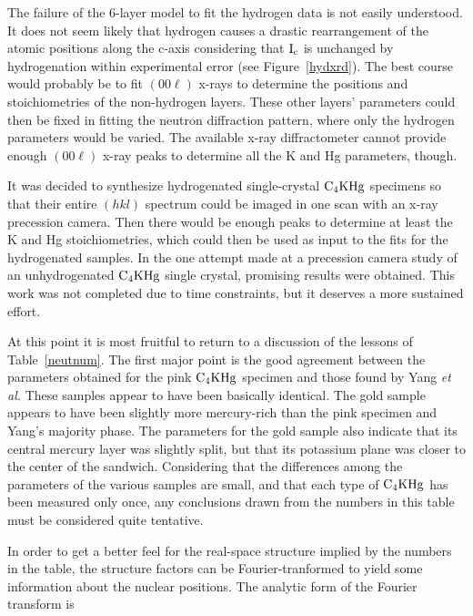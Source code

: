         The failure of the 6-layer  model to fit  the hydrogen data is  not
easily understood.  It does not seem likely that  hydrogen causes a drastic
rearrangement  of the  atomic positions along  the  c-axis considering that
$\rm  I_c$ is  unchanged  by hydrogenation within experimental  error  (see
Figure~\ref{hydxrd}).  The best course  would probably be to fit $(00\ell)$
x-rays to determine the positions and stoichiometries  of  the non-hydrogen
layers.  These other layers' parameters could then  be fixed in fitting the
neutron diffraction pattern,  where only the hydrogen   parameters would be
varied.  The   available   x-ray    diffractometer  cannot  provide  enough
$(00\ell)$ x-ray peaks to determine all the K and Hg parameters, though.

        It  was  decided  to synthesize  hydrogenated   single-crystal $\rm
C_4KHg$ specimens so that their entire $(hkl)$ spectrum could  be imaged in
one scan with an x-ray  precession camera.\cite{speck88z}  Then there would
be enough peaks to determine at  least the K and Hg  stoichiometries, which
could then  be used as input to  the fits for  the hydrogenated samples. In
the one attempt made at a precession camera study of an unhydrogenated $\rm
C_4KHg$ single crystal, promising results were obtained.  This work was not
completed due to time constraints, but it deserves a more sustained effort.

        At this point it is most fruitful to  return to a discussion of the
lessons of   Table~\ref{neutnum}.    The first  major   point   is the good
agreement between  the   parameters obtained  for the  pink   $\rm  C_4KHg$
specimen and those found by  Yang {\em et al.\/}\cite{yang84} These samples
appear to have been basically identical.   The gold  sample appears to have
been slightly more mercury-rich than the pink specimen  and Yang's majority
phase.  The parameters for the gold  sample also indicate  that its central
mercury layer was  slightly split, but that  its potassium plane was closer
to the center of the sandwich.  Considering  that the differences among the
parameters of the  various samples are  small,  and that each type of  $\rm
C_4KHg$ has been measured only once, any conclusions drawn from the numbers
in this table must be considered quite tentative.

        In order to get a better feel for  the real-space structure implied
by  the    numbers in   the    table,    the   structure factors    can  be
Fourier-tranformed to yield some information  about  the nuclear positions.
The analytic form of the Fourier transform is


